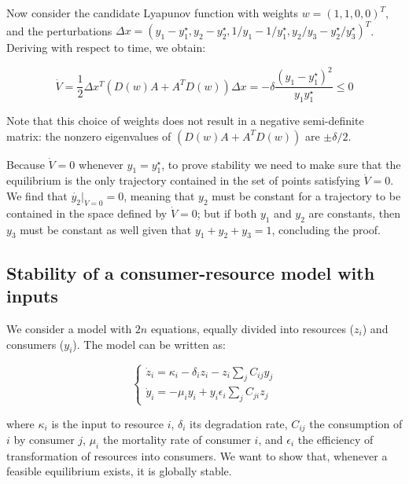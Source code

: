 \documentclass{article}
\begin{document}
Now consider the candidate Lyapunov function with weights
\(w = (1,1,0,0)^T\), and the perturbations
\(\Delta x = (y_1 - y_1^\star, y_2 - y_2^\star, 1/y_1 - 1 / y_1^\star, y_2 / y_3 - y_2^\star / y_3^\star)^T\).
Deriving with respect to time, we obtain:

\begin{equation}
\dot{V} = \frac{1}{2} \Delta x^T (D(w) A + A^T D(w)) \Delta x =  - \delta \frac{(y_1 - y_1^\star)^2}{y_1 y_1^\star} \leq 0
\end{equation}

Note that this choice of weights does not result in a negative
semi-definite matrix: the nonzero eigenvalues of \((D(w) A + A^T D(w))\)
are \(\pm \delta / 2\).

Because \(\dot{V} = 0\) whenever \(y_1 = y_1^\star\), to prove stability
we need to make sure that the equilibrium is the only trajectory
contained in the set of points satisfying \(\dot{V} = 0\). We find that
\(\dot{y_2}|_{\dot{V} = 0} = 0\), meaning that \(y_2\) must be constant
for a trajectory to be contained in the space defined by
\(\dot{V} = 0\); but if both \(y_1\) and \(y_2\) are constants, then
\(y_3\) must be constant as well given that \(y_1 + y_2 + y_3 = 1\),
concluding the proof.

\hypertarget{stability-of-a-consumer-resource-model-with-inputs}{%
\subsection{Stability of a consumer-resource model with
inputs}\label{stability-of-a-consumer-resource-model-with-inputs}}

We consider a model with \(2n\) equations, equally divided into
resources (\(z_i\)) and consumers (\(y_i\)). The model can be written
as:

\begin{equation}
\label{eq:cr}
\begin{cases}
\dot{z}_i = \kappa_i - \delta_i z_i - z_i \sum_j C_{ij} y_j\\
\dot{y}_i = - \mu_i y_i + y_i \epsilon_i \sum_j C_{ji} z_j
\end{cases}
\end{equation}

where \(\kappa_i\) is the input to resource \(i\), \(\delta_i\) its
degradation rate, \(C_{ij}\) the consumption of \(i\) by consumer \(j\),
\(\mu_i\) the mortality rate of consumer \(i\), and \(\epsilon_i\) the
efficiency of transformation of resources into consumers. We want to
show that, whenever a feasible equilibrium exists, it is globally
stable.
\end{document}
